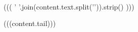 \,\,\begin{underline}{((( ' '.join(content.text.split('\n')).strip() )))}\end{underline}(((content.tail)))
